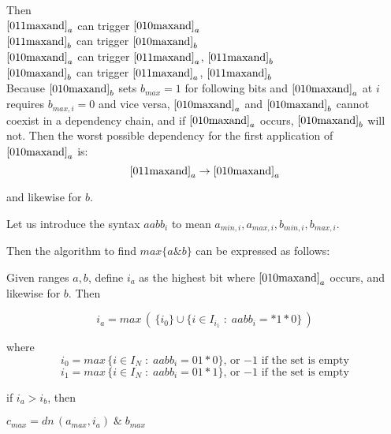 \documentclass{article}
\begin{document}
\vspace{10pt}

Then\\
$\eqref{011maxand}_a$ \quad can trigger \quad $\eqref{010maxand}_a$\\
$\eqref{011maxand}_b$ \quad can trigger \quad $\eqref{010maxand}_b$\\
$\eqref{010maxand}_a$ \quad can trigger \quad $\eqref{011maxand}_a$, $\eqref{011maxand}_b$\\
$\eqref{010maxand}_b$ \quad can trigger \quad $\eqref{011maxand}_a$, $\eqref{011maxand}_b$\\

Because $\eqref{010maxand}_b$ sets $b_{max} = 1$ for following bits
and $\eqref{010maxand}_a$ at $i$ requires $b_{max,i} = 0$ and vice versa,
$\eqref{010maxand}_a$ and $\eqref{010maxand}_b$ cannot coexist in a 
dependency chain, and if $\eqref{010maxand}_a$ occurs, $\eqref{010maxand}_b$ 
will not.
Then the worst possible dependency
for the first application of $\eqref{010maxand}_a$ is:
\begin{equation*} 
\eqref{011maxand}_a \rightarrow \eqref{010maxand}_a
\end{equation*}

and likewise for $b$. 

Let us introduce the syntax $aabb_i$ to mean 
$a_{min,i},a_{max,i},b_{min,i},b_{max,i}$.

Then the algorithm to find $max \{a\&b\}$ can be expressed as follows:
\vspace{10pt}

Given ranges $a,b$, define $i_a$ as the highest bit where 
$\eqref{010maxand}_a$ occurs, and likewise for $b$. Then

\begin{equation*}
i_a = max \, ( \, \{i_0\} \cup \{i \in I_{i_1}\; : \; 
            aabb_i = *1*0\} \, ) 
\end{equation*}

where
\begin{equation*}
i_0 = max \, \{i \in I_N\; : \; 
aabb_i = 01*0\},\,
\text{or $-1$ if the set is empty}
\end{equation*}
\begin{equation*}
i_1 = max \, \{i\in I_N\; : \; 
aabb_i = 01*1\},\,
\text{or $-1$ if the set is empty}
\end{equation*}
\vspace{0pt}

if $i_a > i_b$, then

\quad $c_{max} = dn\,(a_{max},i_a) \; \text{\&} \; b_{max} $
\end{document}
